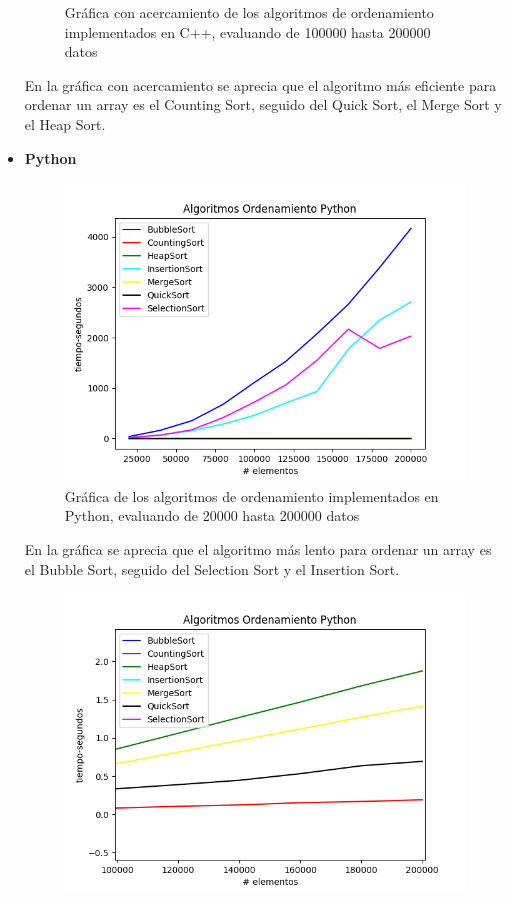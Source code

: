 \begin{itemize}
\begin{figure}[H]
	        \caption{Gráfica con acercamiento de los algoritmos de ordenamiento implementados en C++, evaluando de 100000 hasta 200000 datos}
		\end{figure}
En la gráfica con acercamiento se aprecia que el algoritmo más eficiente para ordenar un array es el Counting Sort, seguido del Quick Sort, el Merge Sort y el Heap Sort.
    \item \textbf{Python}
        \begin{figure}[H]
	        \centering
	        \includegraphics[scale=0.5]{Practica01/images/plots/Sorts_Python.png}
	        \caption{Gráfica de los algoritmos de ordenamiento implementados en Python, evaluando de 20000 hasta 200000 datos}
		\end{figure}
En la gráfica se aprecia que el algoritmo más lento para ordenar un array es el Bubble Sort, seguido del Selection Sort y el Insertion Sort.
        \begin{figure}[H]
	        \centering
	        \includegraphics[scale=0.5]{Practica01/images/plots/Sorts2_Python.png}

\end{figure}
\end{itemize}
